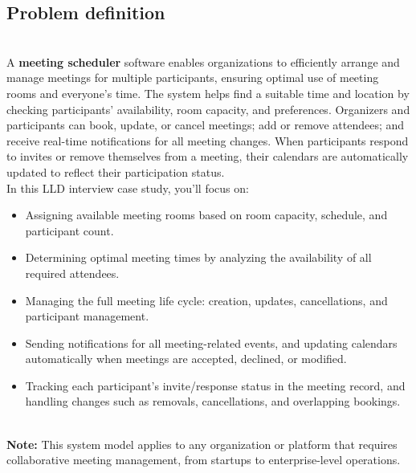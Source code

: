 

\subsection{Problem definition}\label{wqzw3-1bB9gP-uGZtnIp8-1}
\\
A \textbf{meeting scheduler} software enables organizations to efficiently arrange and manage meetings for multiple participants, ensuring optimal use of meeting rooms and everyone's time. The system helps find a suitable time and location by checking participants' availability, room capacity, and preferences. Organizers and participants can book, update, or cancel meetings; add or remove attendees; and receive real-time notifications for all meeting changes. When participants respond to invites or remove themselves from a meeting, their calendars are automatically updated to reflect their participation status.
\\
In this LLD interview case study, you'll focus on:

\begin{itemize}
\item
\protect{}\label{_OKyNwb9JcVkc1l_oSAJ4}
Assigning available meeting rooms based on room capacity, schedule, and participant count.
\item
\protect{}\label{FHReYFuSrnvsgLVQ6cg6L}
Determining optimal meeting times by analyzing the availability of all required attendees.
\item
\protect{}\label{Mq8tNC_NTC29sZjjgdqca}
Managing the full meeting life cycle: creation, updates, cancellations, and participant management.
\item
\protect{}\label{4cwBqt3PRrbfOFwXEpiop}
Sending notifications for all meeting-related events, and updating calendars automatically when meetings are accepted, declined, or modified.
\item
\protect{}\label{XXlMC7zehaI63fsROdUTB}
Tracking each participant's invite/response status in the meeting record, and handling changes such as removals, cancellations, and overlapping bookings.
\end{itemize}
\\
\textbf{Note:} This system model applies to any organization or platform that requires collaborative meeting management, from startups to enterprise-level operations.

